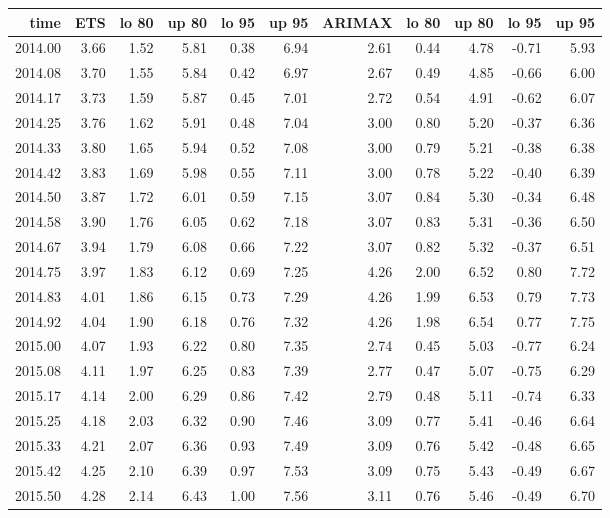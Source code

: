 \documentclass[10pt,a4paper]{article}\usepackage[]{graphicx}\usepackage[]{color}
\begin{document}
\begin{table}[ht]
\centering
\begin{tabular}{rrrrrrrrrrr}
  \hline
time & ETS  & lo 80 & up 80 & lo 95 & up 95 & ARIMAX  & lo 80 & up 80 & lo 95 & up 95 \\ 
  \hline
2014.00 & 3.66 & 1.52 & 5.81 & 0.38 & 6.94 & 2.61 & 0.44 & 4.78 & -0.71 & 5.93 \\ 
  2014.08 & 3.70 & 1.55 & 5.84 & 0.42 & 6.97 & 2.67 & 0.49 & 4.85 & -0.66 & 6.00 \\ 
  2014.17 & 3.73 & 1.59 & 5.87 & 0.45 & 7.01 & 2.72 & 0.54 & 4.91 & -0.62 & 6.07 \\ 
  2014.25 & 3.76 & 1.62 & 5.91 & 0.48 & 7.04 & 3.00 & 0.80 & 5.20 & -0.37 & 6.36 \\ 
  2014.33 & 3.80 & 1.65 & 5.94 & 0.52 & 7.08 & 3.00 & 0.79 & 5.21 & -0.38 & 6.38 \\ 
  2014.42 & 3.83 & 1.69 & 5.98 & 0.55 & 7.11 & 3.00 & 0.78 & 5.22 & -0.40 & 6.39 \\ 
  2014.50 & 3.87 & 1.72 & 6.01 & 0.59 & 7.15 & 3.07 & 0.84 & 5.30 & -0.34 & 6.48 \\ 
  2014.58 & 3.90 & 1.76 & 6.05 & 0.62 & 7.18 & 3.07 & 0.83 & 5.31 & -0.36 & 6.50 \\ 
  2014.67 & 3.94 & 1.79 & 6.08 & 0.66 & 7.22 & 3.07 & 0.82 & 5.32 & -0.37 & 6.51 \\ 
  2014.75 & 3.97 & 1.83 & 6.12 & 0.69 & 7.25 & 4.26 & 2.00 & 6.52 & 0.80 & 7.72 \\ 
  2014.83 & 4.01 & 1.86 & 6.15 & 0.73 & 7.29 & 4.26 & 1.99 & 6.53 & 0.79 & 7.73 \\ 
  2014.92 & 4.04 & 1.90 & 6.18 & 0.76 & 7.32 & 4.26 & 1.98 & 6.54 & 0.77 & 7.75 \\ 
  2015.00 & 4.07 & 1.93 & 6.22 & 0.80 & 7.35 & 2.74 & 0.45 & 5.03 & -0.77 & 6.24 \\ 
  2015.08 & 4.11 & 1.97 & 6.25 & 0.83 & 7.39 & 2.77 & 0.47 & 5.07 & -0.75 & 6.29 \\ 
  2015.17 & 4.14 & 2.00 & 6.29 & 0.86 & 7.42 & 2.79 & 0.48 & 5.11 & -0.74 & 6.33 \\ 
  2015.25 & 4.18 & 2.03 & 6.32 & 0.90 & 7.46 & 3.09 & 0.77 & 5.41 & -0.46 & 6.64 \\ 
  2015.33 & 4.21 & 2.07 & 6.36 & 0.93 & 7.49 & 3.09 & 0.76 & 5.42 & -0.48 & 6.65 \\ 
  2015.42 & 4.25 & 2.10 & 6.39 & 0.97 & 7.53 & 3.09 & 0.75 & 5.43 & -0.49 & 6.67 \\ 
  2015.50 & 4.28 & 2.14 & 6.43 & 1.00 & 7.56 & 3.11 & 0.76 & 5.46 & -0.49 & 6.70 \\ 

\end{tabular}
\end{table}
\end{document}
